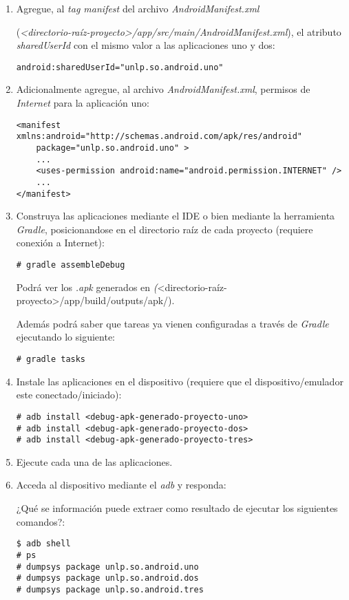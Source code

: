 \begin{itemize}
\begin{enumerate}
    \item Agregue, al \textit{tag manifest} del archivo \textit{AndroidManifest.xml} 
    
    (\emph{<directorio-raíz-proyecto>/app/src/main/AndroidManifest.xml}), el atributo \textit{sharedUserId} con el mismo valor a las aplicaciones uno y dos:
    \begin{lstlisting}
android:sharedUserId="unlp.so.android.uno"
    \end{lstlisting}
    
    \item Adicionalmente agregue, al archivo \textit{AndroidManifest.xml},  permisos de \emph{Internet} para la aplicación uno:
    \begin{lstlisting}
<manifest xmlns:android="http://schemas.android.com/apk/res/android"
    package="unlp.so.android.uno" >
    ...
    <uses-permission android:name="android.permission.INTERNET" />
    ...
</manifest>
    \end{lstlisting}
    
    \item Construya las aplicaciones mediante el IDE o bien mediante la herramienta \textit{Gradle}, posicionandose en el directorio raíz de cada proyecto (requiere conexión a Internet):
    \begin{lstlisting}
# gradle assembleDebug
    \end{lstlisting}
    Podrá ver los \textit{.apk} generados en \emph(<directorio-raíz-proyecto>/app/build/outputs/apk/). 
    
    Además podrá saber que tareas ya vienen configuradas a través de \textit{Gradle} ejecutando lo siguiente:
    \begin{lstlisting}
# gradle tasks
    \end{lstlisting}
     
    \item Instale las aplicaciones en el dispositivo (requiere que el dispositivo/emulador este conectado/iniciado):
    \begin{lstlisting}
# adb install <debug-apk-generado-proyecto-uno>
# adb install <debug-apk-generado-proyecto-dos>
# adb install <debug-apk-generado-proyecto-tres>
    \end{lstlisting}
    
    \item Ejecute cada una de las aplicaciones.
    
    \item Acceda al dispositivo mediante el \textit{adb} y responda:
    \begin{questions}
        \question ¿Qué se información puede extraer como resultado de ejecutar los siguientes comandos?:
        \begin{lstlisting}
$ adb shell
# ps        
# dumpsys package unlp.so.android.uno
# dumpsys package unlp.so.android.dos
# dumpsys package unlp.so.android.tres
        \end{lstlisting}
    \end{questions}
    

\end{enumerate}
\end{itemize}
